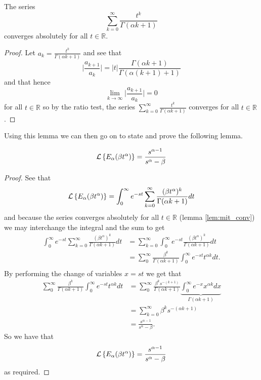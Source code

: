 \begin{lemma}
\label{lem:mit_conv}

	The series
	$$
		\sum_{k=0}^{\infty} \frac{t^k}{\Gamma(\alpha k + 1)} 
	$$
  	converges absolutely for all $ t \in \mathbb{R} $.
\end{lemma}
\begin{proof}
	Let $ a_k = \frac{t^k}{\Gamma(\alpha k + 1) }$ and see that
	$$ \lvert \frac{a_{k+1}}{a_k} \rvert = |t| \frac{\Gamma(\alpha k + 1) }{\Gamma(\alpha(k+1) + 1)} $$
	and that hence 
	$$
		\lim_{k \longrightarrow \infty} \lvert \frac{a_{k+1}}{a_k} \rvert = 0
	$$
	for all $ t \in \mathbb{R} $ so by the ratio test, the series $ \sum_{k=0}^{\infty} \frac{t^k}{\Gamma(\alpha k + 1)}  $
	converges for all $ t \in \mathbb{R} $.
\end{proof}

Using this lemma we can then go on to state and prove the following lemma.

\begin{lemma}
\label{lem:lap_mit}
	\begin{align}	
		\mathcal{L} \left\{  E_\alpha (\beta t^\alpha) \right\} = \frac{s^{\alpha - 1}}{s^\alpha - \beta}
	\end{align}
\end{lemma}
\begin{proof}
	See that
	\begin{align}
		\mathcal{L} \left\{  E_\alpha (\beta t^\alpha) \right\} = \int_0^\infty e^{-st} \sum_{k=0}^\infty \frac{(\beta t^\alpha)^k}{\Gamma(\alpha k+1)} dt
	\end{align}
	and because the series converges absolutely for all $ t \in \mathbb{R} $ (lemma \ref{lem:mit_conv}) we may interchange the integral
	and the sum to get
	\begin{align}
		\int_0^\infty e^{-st} \sum_{k=0}^\infty \frac{(\beta t^\alpha)^k}{\Gamma(\alpha k+1)} dt &= \sum_{k=0}^\infty \int_0^\infty e^{-st} \frac{(\beta t^\alpha)^k}{\Gamma(\alpha k + 1)} dt \\
			&= \sum_0^\infty \frac{\beta^k}{\Gamma(\alpha k + 1)} \int_0^\infty e^{-st} t^{\alpha k} dt. \\
	\end{align}
	By performing the change of variables $ x =st $ we get that 
	\begin{align}
		\sum_0^\infty \frac{\beta^k}{\Gamma(\alpha k + 1)} \int_0^\infty e^{-st} t^{\alpha k} dt 
			&= \sum_0^\infty \frac{\beta^k s^{-(k+1)}}{\Gamma(\alpha k + 1)} \underbrace{\int_0^\infty e^{-x} x^{\alpha k} dx}_{\Gamma(\alpha k + 1)} \\
			&= \sum_{k=0}^\infty \beta^{k} s^{-(\alpha k + 1)} \\
			&= \frac{s^{\alpha-1}}{s^\alpha - \beta}.		
	\end{align}
	So we have that 
	\begin{align}	
		\mathcal{L} \left\{  E_\alpha (\beta t^\alpha) \right\} = \frac{s^{\alpha - 1}}{s^\alpha - \beta}
	\end{align}	
	as required.
\end{proof}


